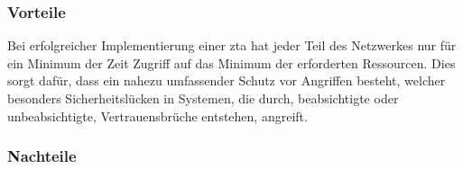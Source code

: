 \subsubsection{Vorteile}\label{subsubsec:vorteile}
Bei erfolgreicher Implementierung einer \ac{zta} hat jeder Teil des Netzwerkes nur für ein Minimum der Zeit Zugriff auf das Minimum der erforderten Ressourcen.
Dies sorgt dafür, dass ein nahezu umfassender Schutz vor Angriffen besteht, welcher besonders Sicherheitslücken in Systemen, die durch, beabsichtigte oder unbeabsichtigte, Vertrauensbrüche entstehen, angreift\autocite[\vglf][]{Edo-2022}.


\subsubsection{Nachteile}\label{subsubsec:nachteile}
